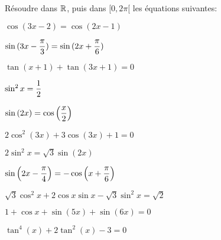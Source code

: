 \documentclass[a4paper, 11pt]{article}
\begin{document}
\begin{exercice}  \;
R\'esoudre dans $\mathbb{R}$, puis dans $\lbrack 0,2\pi\lbrack$ les \'equations suivantes:
\begin{enumerate}
\begin{minipage}[t]{0.45\textwidth}
\item $\cos{(3x-2)}=\cos{(2x-1)}$
\item $\sin{(3x-\displaystyle\frac{\pi}{3})}=\sin{(2x+\displaystyle\frac{\pi}{6})}$
\item $\tan{(x+1)}+\tan{(3x+1)}=0$
\item $\sin^2{x}=\displaystyle\frac{1}{2}$
\item $\sin{(2x)}=\cos{\left(\displaystyle\frac{x}{2}\right)}$
\end{minipage}
\begin{minipage}[t]{0.45\textwidth}
\item $2\cos^2{(3x)}+3\cos{(3x)}+1=0$
\item $2\sin^2{x}=\sqrt{3}\sin{(2x)}$ 
\item $\sin{\left(2x-\displaystyle\frac{\pi}{4}\right)}=-\cos{\left(x+\displaystyle\frac{\pi}{6}\right)}$
\item $\sqrt{3}\cos^2{x}+2\cos{x}\sin{x}-\sqrt{3}\sin^2{x}=\sqrt{2}$
\item $1+\cos{x}+\sin{(5x)}+\sin{(6x)}=0$
\item $\tan^4{(x)}+2\tan^2{(x)}-3=0$
\end{minipage}
\end{enumerate}
\end{exercice}
\end{document}
